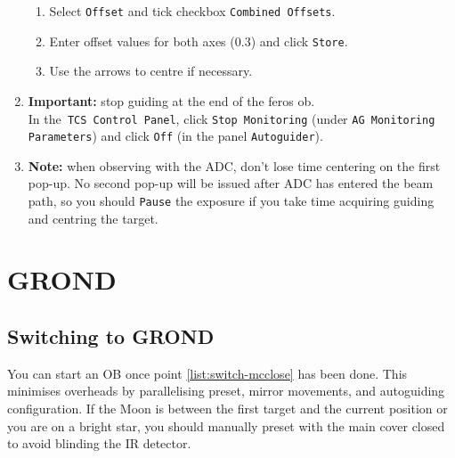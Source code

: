 \documentclass[11pt,fleqn]{book}
\begin{document}
\begin{enumerate}
\begin{enumerate}
       \item Select \texttt{Offset} and tick checkbox \texttt{Combined Offsets}.
       \item Enter offset values for both axes (0.3) and click \texttt{Store}.
       \item Use the arrows to centre if necessary.  
    \end{enumerate}
  \item \textbf{Important:} stop guiding at the end of the \gls{feros} \gls{ob}.\\
  In the\texttt{ TCS Control Panel}, click \texttt{Stop Monitoring} (under \texttt{AG Monitoring Parameters}) and click \texttt{Off} (in the panel \texttt{Autoguider}).  
  \item \textbf{Note:} when observing with the ADC, don't lose time centering on the first pop-up.  No second
     pop-up will be issued after ADC has entered the beam path, so you should
     \texttt{Pause} the exposure if you take time acquiring guiding and centring
     the target.
\end{enumerate}

\section{GROND}

\subsection{Switching to GROND}

You can start an OB once point \ref{list:switch-mcclose} has been done.  This minimises overheads by parallelising \gls{preset}, mirror movements, and autoguiding configuration.  If the Moon is between the first target and the current position or you are on a bright star, you should manually preset with the main cover closed to avoid blinding the IR detector.
\end{document}
